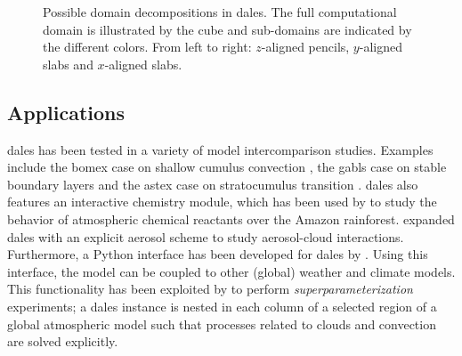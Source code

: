\begin{figure}[H]
    \centering
    
    \caption{Possible domain decompositions in \acrshort{dales}. The full computational domain is illustrated by the cube and sub-domains are indicated by the different colors. From left to right: $z$-aligned pencils, $y$-aligned slabs and $x$-aligned slabs.}
    \label{fig:dales_domain_decomposition}
\end{figure}

\newpage

\subsection{Applications}
\acrshort{dales} has been tested in a variety of model intercomparison studies. Examples include the \acrshort{bomex} case on shallow cumulus convection \citep{siebesmaLargeEddySimulation2003}, the \acrshort{gabls} case on stable boundary layers \citep{beareIntercomparisonLargeEddySimulations2006} and the \acrshort{astex} case on stratocumulus transition \citep{vanderdussenGASSEUCLIPSEModel2013}. \acrshort{dales} also features an interactive chemistry module, which has been used by \citet{vila-gueraudearellanoRoleBoundaryLayer2011} to study the behavior of atmospheric chemical reactants over the Amazon rainforest. \citet{debruineExplicitAerosolCloud2019} expanded \acrshort{dales} with an explicit aerosol scheme to study aerosol-cloud interactions. Furthermore, a Python interface has been developed for \acrshort{dales} by \citet{vandenoordPythonInterfaceDutch2020}. Using this interface, the model can be coupled to other (global) weather and climate models. This functionality has been exploited by \citet{janssonRegionalSuperparameterizationGlobal2019} to perform \emph{superparameterization} experiments; a \acrshort{dales} instance is nested in each column of a selected region of a global atmospheric model such that processes related to clouds and convection are solved explicitly.